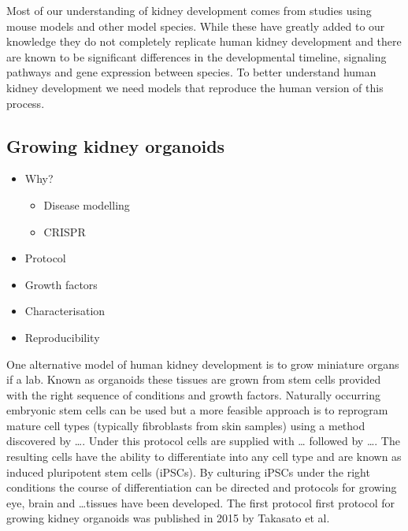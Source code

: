 \documentclass[11pt,a4paper,titlepage,twoside,openright]{style/unimelbthesis}
\theoremstyle{definition}
\theoremstyle{definition}
\theoremstyle{definition}
\theoremstyle{remark}
\begin{document}
\begin{mainmatter}
Most of our understanding of kidney development comes from studies using mouse models and other model species. While these have greatly added to our knowledge they do not completely replicate human kidney development and there are known to be significant differences in the developmental timeline, signaling pathways and gene expression between species. To better understand human kidney development we need models that reproduce the human version of this process.

\hypertarget{growing-kidney-organoids}{%
\subsection{Growing kidney organoids}\label{growing-kidney-organoids}}

\begin{itemize}
\tightlist
\item
  Why?

  \begin{itemize}
  \tightlist
  \item
    Disease modelling
  \item
    CRISPR
  \end{itemize}
\item
  Protocol
\item
  Growth factors
\item
  Characterisation
\item
  Reproducibility
\end{itemize}

One alternative model of human kidney development is to grow miniature organs if a lab. Known as organoids these tissues are grown from stem cells provided with the right sequence of conditions and growth factors. Naturally occurring embryonic stem cells can be used but a more feasible approach is to reprogram mature cell types (typically fibroblasts from skin samples) using a method discovered by \ldots{}. Under this protocol cells are supplied with \ldots{} followed by \ldots{}. The resulting cells have the ability to differentiate into any cell type and are known as induced pluripotent stem cells (iPSCs). By culturing iPSCs under the right conditions the course of differentiation can be directed and protocols for growing eye, brain and \ldots{}tissues have been developed. The first protocol first protocol for growing kidney organoids was published in 2015 by Takasato et al.


\end{mainmatter}
\end{document}
